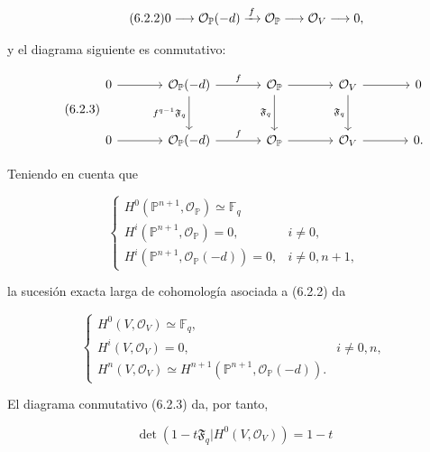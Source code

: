 \begin{equation}\tag{6.2.2}
0\longrightarrow\mathcal O_{\mathbb P}(-d)
\xrightarrow{\,f\,}\mathcal O_{\mathbb P}
\longrightarrow\mathcal O_V\longrightarrow\sisi{\mathcal O}{0},
\end{equation}

y el diagrama siguiente es conmutativo:

\begin{equation}\tag{6.2.3}
\begin{tikzcd}[column sep=large,row sep=large]
0 \arrow[r] &
\mathcal O_{\mathbb P}(-d) \arrow[r,"f"] \arrow[d,"f^{q-1}\mathfrak F_q"'] &
\mathcal O_{\mathbb P} \arrow[r] \arrow[d,"\mathfrak F_q"'] &
\mathcal O_V \arrow[r] \arrow[d,"\mathfrak F_q"'] &
\sisi{\mathcal O}{0}\\
0 \arrow[r] &
\mathcal O_{\mathbb P}(-d) \arrow[r,"f"] &
\mathcal O_{\mathbb P} \arrow[r] &
\mathcal O_V \arrow[r] &
\sisi{\mathcal O}{0} .
\end{tikzcd}
\end{equation}

\pageoriginale

Teniendo en cuenta que

\begin{equation}\tag{6.2.4}
\begin{cases}
H^0(\mathbb P^{n+1},\mathcal O_{\mathbb P})\simeq\mathbb F_q\\
H^i(\mathbb P^{n+1},\mathcal O_{\mathbb P})=0,
&i\ne0,\\
H^i(\mathbb P^{n+1},\mathcal O_{\mathbb P}(-d))=0,
&i\ne0,n+1,
\end{cases}
\end{equation}

la sucesión exacta larga de cohomología asociada a (6.2.2) da

\begin{equation}\tag{6.2.5}
\begin{cases}
H^0(V,\mathcal O_V)\simeq\mathbb F_q,\\
H^i(V,\mathcal O_V)=0,&i\ne0,n,\\
H^n(V,\mathcal O_V)
\simeq H^{n+1}(\mathbb P^{n+1},\mathcal O_{\mathbb P}(-d)).
\end{cases}
\end{equation}

El diagrama conmutativo (6.2.3) da, por tanto,

\begin{equation}\tag{6.2.6}
\det\!\left(1-t\mathfrak F_q
\mathrel{\Big|}H^0(V,\mathcal O_V)\right)=1-t
\end{equation}

